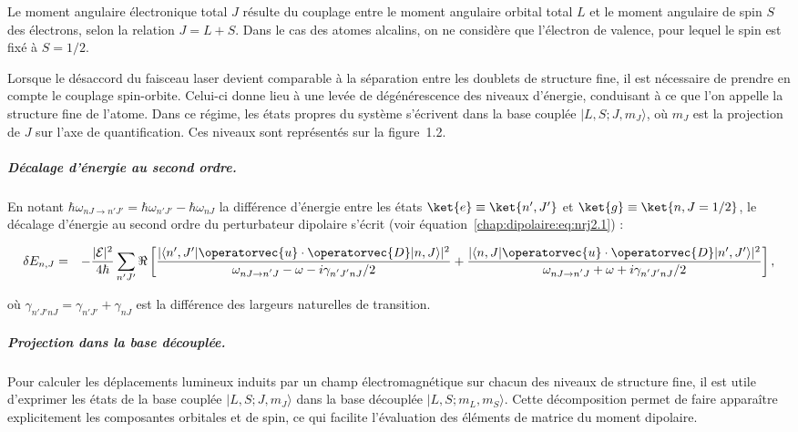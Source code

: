 Le moment angulaire électronique total $J$ résulte du couplage entre le moment angulaire orbital total $L$ et le moment angulaire de spin $S$ des électrons, selon la relation $J = L + S$. Dans le cas des atomes alcalins, on ne considère que l’électron de valence, pour lequel le spin est fixé à $S = 1/2$.

Lorsque le désaccord du faisceau laser devient comparable à la séparation entre les doublets de structure fine, il est nécessaire de prendre en compte le couplage spin-orbite. Celui-ci donne lieu à une levée de dégénérescence des niveaux d’énergie, conduisant à ce que l’on appelle la structure fine de l’atome. Dans ce régime, les états propres du système s’écrivent dans la base couplée $|L, S; J, m_J\rangle$, où $m_J$ est la projection de $J$ sur l’axe de quantification. Ces niveaux sont représentés sur la figure~1.2.

\subparagraph{Décalage d’énergie au second ordre.}
En notant $\hbar\omega_{ \scriptstyle nJ \rightarrow n'J'} = \hbar\omega_{n'J'} - \hbar\omega_{nJ}$ la différence d’énergie entre les états $\ket{e} \equiv \ket{n', J'}$ et $\ket{g} \equiv \ket{n, J=1/2}$, le décalage d’énergie au second ordre du perturbateur dipolaire s’écrit (voir équation~\eqref{chap:dipolaire:eq:nrj2.1}) :

\begin{eqnarray}
	\delta E_{n,J} & = & -\frac{|\mathcal{E}|^2}{4\hbar} \sum_{n'J'} \Re\left[
		\frac{|\langle n',J'|\operatorvec{u} \cdot \operatorvec{D}|n,J\rangle|^2}{\omega_{\scriptstyle nJ \rightarrow n'J} - \omega - i\gamma_{\scriptstyle n'J'nJ}/2}
		+
		\frac{|\langle n,J|\operatorvec{u} \cdot \operatorvec{D}|n',J'\rangle|^2}{\omega_{\scriptstyle nJ \rightarrow n'J} + \omega + i\gamma_{\scriptstyle n'J'nJ}/2}
	\right],\label{chap:dipolaire:eq:nrj2.3}
\end{eqnarray}

où $\gamma_{\scriptstyle  n'J'nJ} = \gamma_{n'J'} + \gamma_{nJ}$ est la différence des largeurs naturelles de transition.


\subparagraph{Projection dans la base découplée.}

Pour calculer les déplacements lumineux induits par un champ électromagnétique sur chacun des niveaux de structure fine, il est utile d'exprimer les états de la base couplée $|L, S; J, m_J\rangle$ dans la base découplée $|L, S; m_L, m_S\rangle$. Cette décomposition permet de faire apparaître explicitement les composantes orbitales et de spin, ce qui facilite l’évaluation des éléments de matrice du moment dipolaire.

